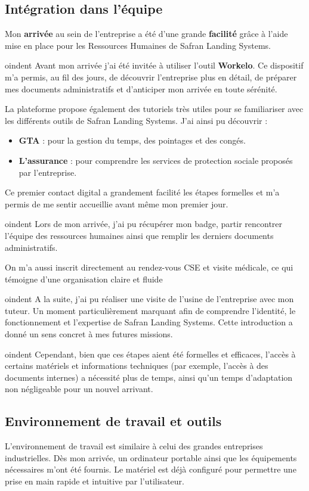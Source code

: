 \subsection*{Intégration dans l'équipe}
{}
Mon \textbf{arrivée} au sein de l’entreprise a été d’une grande \textbf{facilité} grâce à l’aide mise en place pour les Ressources Humaines de Safran Landing Systems.

oindent Avant mon arrivée j'ai été invitée à utiliser l'outil \textbf{Workelo}. Ce dispositif m'a permis, au fil des jours, de découvrir l'entreprise plus en détail, de préparer mes documents administratifs et d'anticiper mon arrivée en toute sérénité.

\noindent La plateforme propose également des tutoriels très utiles pour se familiariser avec les différents outils de Safran Landing Systems. J'ai ainsi pu découvrir :
\begin{itemize}
  \item \textbf{GTA} : pour la gestion du temps, des pointages et des congés.
  \item \textbf{L'assurance} : pour comprendre les services de protection sociale proposés par l'entreprise.
\end{itemize}

\noindent Ce premier contact digital a grandement facilité les étapes formelles et m'a permis de me sentir accueillie avant même mon premier jour.

oindent Lors de mon arrivée, j'ai pu récupérer mon badge, partir rencontrer l'équipe des ressources humaines ainsi que remplir les derniers documents administratifs.

\noindent On m’a aussi inscrit directement au rendez-vous CSE et visite médicale, ce qui témoigne d’une organisation claire et fluide

oindent A la suite, j'ai pu réaliser une visite de l'usine de l'entreprise avec mon tuteur. Un moment particulièrement marquant afin de comprendre l'identité, le fonctionnement et l'expertise de Safran Landing Systems. Cette introduction a donné un sens concret à mes futures missions.

oindent Cependant, bien que ces étapes aient été formelles et efficaces, l'accès à certains matériels et informations techniques (par exemple, l'accès à des documents internes) a nécessité plus de temps, ainsi qu'un temps d'adaptation non négligeable pour un nouvel arrivant.

\subsection*{Environnement de travail et outils}
{}
L’environnement de travail est similaire à celui des grandes entreprises industrielles. Dès mon arrivée, un ordinateur portable ainsi que les équipements nécessaires m'ont été fournis. Le matériel est déjà configuré pour permettre une prise en main rapide et intuitive par l'utilisateur.

